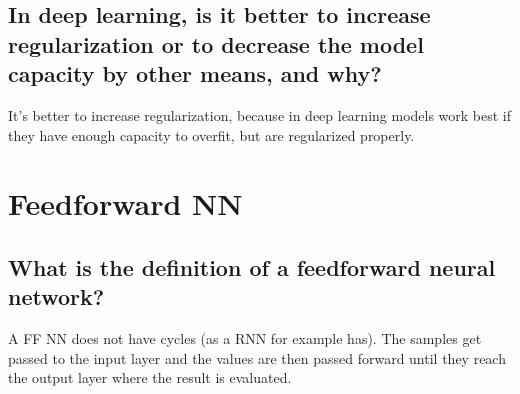 \subsection{In deep learning, is it better to increase regularization or to decrease the model capacity by other means, and why?}
It's better to increase regularization, because in deep learning models work best if they have enough capacity to overfit, but are regularized properly.

\section{Feedforward NN}
\subsection{What is the definition of a feedforward neural network?}
A FF NN does not have cycles (as a RNN for example has). The samples get passed to the input layer and the values are then passed forward until they reach the output layer where the result is evaluated.
